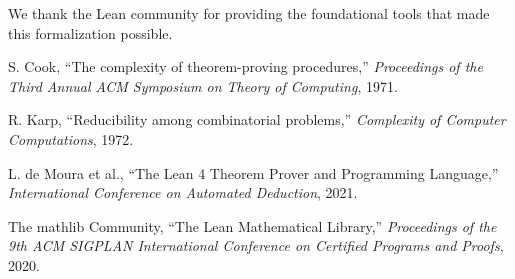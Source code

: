 \documentclass[11pt]{article}
\begin{document}
We thank the Lean community for providing the foundational tools that made this formalization possible.


\begin{thebibliography}{99}

S. Cook, ``The complexity of theorem-proving procedures,'' 
\emph{Proceedings of the Third Annual ACM Symposium on Theory of Computing}, 1971.

R. Karp, ``Reducibility among combinatorial problems,'' 
\emph{Complexity of Computer Computations}, 1972.

L. de Moura et al., ``The Lean 4 Theorem Prover and Programming Language,'' 
\emph{International Conference on Automated Deduction}, 2021.

The mathlib Community, ``The Lean Mathematical Library,'' 
\emph{Proceedings of the 9th ACM SIGPLAN International Conference on Certified Programs and Proofs}, 2020.

\end{thebibliography}
\end{document}
